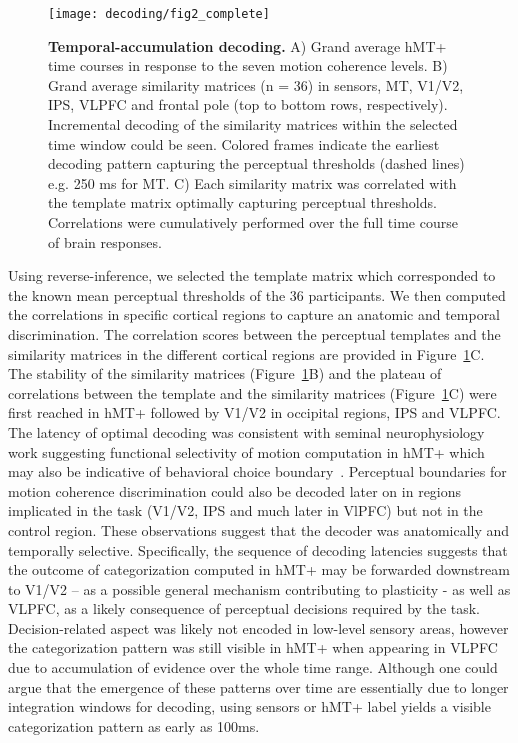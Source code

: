 \begin{figure}
\centering
	\texttt{[image: decoding/fig2\_complete]}
    \caption{{\bf Temporal-accumulation decoding.} A) Grand average hMT+ time courses in response to the seven motion coherence levels. B) Grand average similarity matrices (n = 36) in sensors, MT, V1/V2,  IPS, VLPFC and frontal pole (top to bottom rows, respectively). Incremental decoding of the similarity matrices within the selected time window could be seen. Colored frames indicate the earliest decoding pattern capturing the perceptual thresholds (dashed lines) e.g. 250 ms for MT. C) Each similarity matrix was correlated with the template matrix optimally capturing perceptual thresholds. Correlations were cumulatively performed over the full time course of brain responses.}\label{fig:fig2}
\end{figure}


Using reverse-inference, we selected the template matrix which corresponded to the known mean perceptual thresholds of the 36 participants. We then computed the correlations in specific cortical regions to capture an anatomic and temporal discrimination. The correlation scores between the perceptual templates and the similarity matrices in the different cortical regions are provided in Figure~\ref{fig:fig2}C. The stability of the similarity matrices (Figure~\ref{fig:fig2}B) and the plateau of correlations between the template and the similarity matrices (Figure~\ref{fig:fig2}C) were first reached in hMT+ followed by V1/V2 in occipital regions, IPS and VLPFC. The latency of optimal decoding was consistent with seminal neurophysiology work suggesting functional selectivity of motion computation in hMT+ which may also be indicative of behavioral choice boundary~\cite{3jazayeri2006optimal,4rust2006mt,14serences2007representation,30britten1996relationship}. 
Perceptual boundaries for motion coherence discrimination could also be decoded later on in regions implicated in the task (V1/V2, IPS and much later in VlPFC) but not in the control region. These observations suggest that the decoder was anatomically and temporally selective. Specifically, the sequence of decoding latencies suggests that the outcome of categorization computed in hMT+ may be forwarded downstream to V1/V2 – as a possible general mechanism contributing to plasticity - as well as VLPFC, as a likely consequence of perceptual decisions required by the task. Decision-related aspect was likely not encoded in low-level sensory areas, however the categorization pattern was still visible in hMT+ when appearing in VLPFC due to accumulation of evidence over the whole time range. Although one could argue that the emergence of these patterns over time are essentially due to longer integration windows for decoding, using sensors or hMT+ label yields a visible categorization pattern as early as 100ms.

